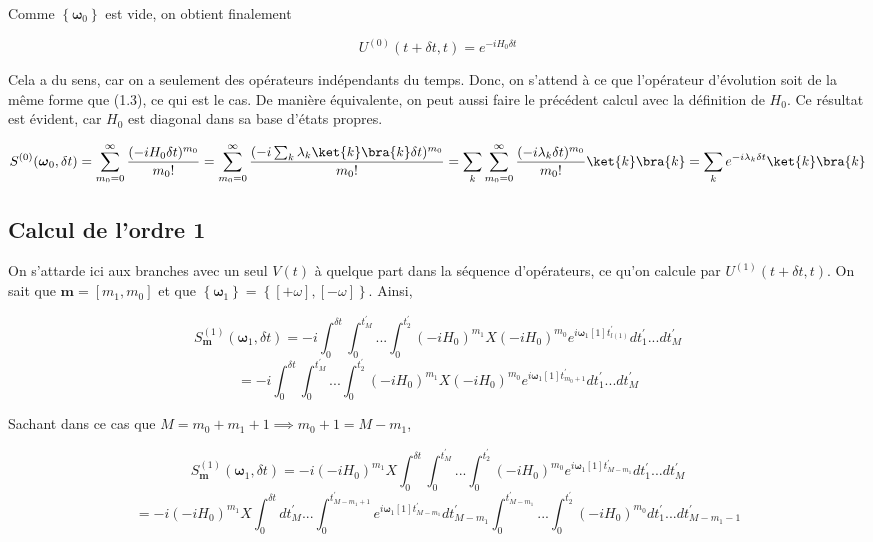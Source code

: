 Comme $\left\{\boldsymbol{\omega}_0\right\}$ est vide, on obtient finalement

\begin{equation*}
    U^{(0)}(t+\delta t, t) = e^{-iH_0\delta t}
\end{equation*}

Cela a du sens, car on a seulement des opérateurs indépendants du temps. Donc, on s'attend à ce que l'opérateur d'évolution soit de la même forme que (1.3), ce qui est le cas. De manière équivalente, on peut aussi faire le précédent calcul avec la définition de $H_0$. Ce résultat est évident, car $H_0$ est diagonal dans sa base d'états propres.

\begin{equation*}
    S^{(0)}(\boldsymbol{\omega}_0, \delta t) = \sum_{m_0 = 0}^{\infty}\frac{(-iH_0\delta t)^{m_0}}{m_0!} = \sum_{m_0 = 0}^{\infty}\frac{(-i\sum_{k}\lambda_k \ket{k}\bra{k}\delta t)^{m_0}}{m_0!} = \sum_{k}\sum_{m_0 = 0}^{\infty}\frac{(-i\lambda_k\delta t)^{m_0}}{m_0!}\ket{k}\bra{k} = \sum_{k}e^{-i\lambda_k\delta t}\ket{k}\bra{k}
\end{equation*}

\subsection{Calcul de l'ordre 1}
On s'attarde ici aux branches avec un seul $V(t)$ à quelque part dans la séquence d'opérateurs, ce qu'on calcule par $ U^{(1)}(t+\delta t, t)$. On sait que $\boldsymbol{m} = [m_1, m_0]$ et que $\left\{\boldsymbol{\omega}_1\right\} = \left\{[+\omega], [-\omega]\right\}$. Ainsi, 

\begin{equation*}
    S^{(1)}_{\boldsymbol{m}}(\boldsymbol{\omega}_1, \delta t) = -i\int_{0}^{\delta t}\int_{0}^{t_M^{'}}... \int_{0}^{t_2^{'}}(-iH_0)^{m_1}X(-iH_0)^{m_0} e^{i\boldsymbol{\omega}_1[1]t^{'}_{l(1)}}dt_1^{'} ... dt_M^{'}
\end{equation*}
\begin{equation*}
    = -i\int_{0}^{\delta t}\int_{0}^{t_M^{'}}... \int_{0}^{t_2^{'}}(-iH_0)^{m_1}X(-iH_0)^{m_0} e^{i\boldsymbol{\omega}_1[1]t^{'}_{m_0+1}}dt_1^{'} ... dt_M^{'}
\end{equation*}

Sachant dans ce cas que $M = m_0 + m_1 + 1 \implies m_0 + 1 = M-m_1$,

\begin{equation*}
    S^{(1)}_{\boldsymbol{m}}(\boldsymbol{\omega}_1, \delta t) = -i (-iH_0)^{m_1}X
    \int_{0}^{\delta t}\int_{0}^{t_M^{'}}... \int_{0}^{t_2^{'}}(-iH_0)^{m_0} e^{i\boldsymbol{\omega}_1[1]t^{'}_{M-m_1}}dt_1^{'} ... dt_M^{'}
\end{equation*}
\begin{equation*}
    = -i (-iH_0)^{m_1}X
    \int_{0}^{\delta t}dt_M^{'} ... \int_{0}^{t^{'}_{M-m_1+1}}e^{i\boldsymbol{\omega}_1[1]t^{'}_{M-m_1}} dt_{M-m_1}^{'}\int_{0}^{t^{'}_{M-m_1}}... \int_{0}^{t_2^{'}}(-iH_0)^{m_0} dt_1^{'} ... dt_{M - m_1 - 1}^{'}
\end{equation*}

